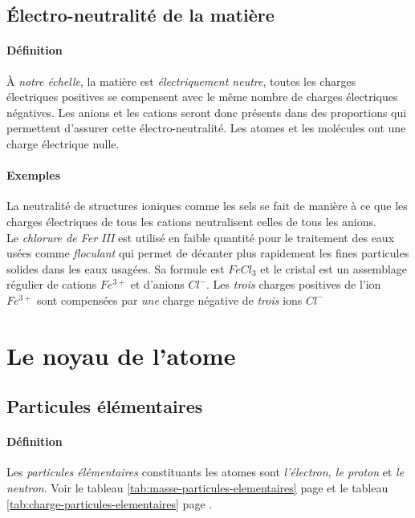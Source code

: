 \subsection{Électro-neutralité de la matière }
\paragraph{Définition} À \textit{notre échelle}, la matière est \textit{électriquement 
neutre}, toutes les charges électriques positives se compensent avec le même nombre
de charges électriques négatives.
Les anions et les cations seront donc présents dans des proportions qui 
permettent d'assurer cette électro-neutralité.
Les atomes et les molécules ont une charge électrique nulle.
\paragraph{Exemples} La neutralité de structures ioniques comme les sels se fait
de manière à ce que les charges électriques de tous les cations neutralisent celles
de tous les anions.\\
Le \textit{chlorure de Fer III} est utilisé en faible quantité pour le traitement des
eaux usées comme \textit{floculant} qui permet de décanter plus rapidement les 
fines particules solides dans les eaux usagées. Sa formule est $FeCl_3$ et le cristal
est un assemblage régulier de cations $Fe^{3+}$ et d'anions $Cl^-$. Les \textit{trois} charges
positives de l'ion $Fe^{3+}$ sont compensées par \textit{une} charge négative 
de \textit{trois} ions $Cl^-$


\section{Le noyau de l'atome}

\subsection{Particules élémentaires}
\paragraph{Définition}
Les \textit{particules élémentaires} constituants les atomes sont \textit{l'électron, le proton} et 
\textit{le neutron}. Voir le tableau \ref{tab:masse-particules-elementaires} page 
\pageref{tab:masse-particules-elementaires} et le tableau \ref{tab:charge-particules-elementaires} 
page \pageref{tab:charge-particules-elementaires}.

